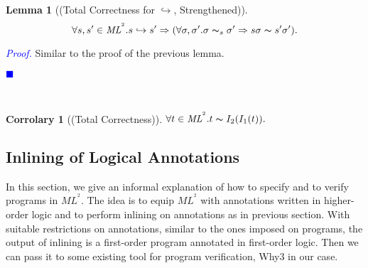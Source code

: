 \documentclass[a4paper,11pt,oneside]{article}
\theoremstyle{plain}
\newtheorem{lemma}[definition]{Lemma}
\newtheorem{corr}[definition]{Corrolary}
\renewenvironment{proof}{\noindent \begin{adjustwidth}{1.5em}{} \textcolor{blue}{\textit{Proof.}}}
{{\begin{tiny}\textcolor{blue}{$\blacksquare$}\end{tiny}}
\end{adjustwidth}~\\\noindent}
\newcommand{\inlsrc}{\textit{ML}^{^2}}
\newcommand{\icarr}{\hookrightarrow}
\newcommand{\ic}[2]{#1 \icarr #2}
\begin{document}
	\begin{lemma}[(Total Correctness for $\icarr$, Strengthened)]
     $$ \forall s,s' \in \inlsrc. \ic{s}{s'} \Rightarrow (\forall \sigma, \sigma'. \sigma \thicksim_s \sigma' \Rightarrow s\sigma \thicksim s'\sigma').$$
  \end{lemma}
	\begin{proof}
	 Similar to the proof of the previous lemma.
	\end{proof}	  
	
  \begin{corr}[(Total Correctness)]
   $ \forall t \in \inlsrc. t \thicksim I_2(I_1(t)).$
  \end{corr}	

	

\subsection{Inlining of Logical Annotations}

In this section, we give an informal explanation of how to specify and
to verify programs in $\inlsrc$. The idea is to equip $\inlsrc$ with
annotations written in higher-order logic and to perform inlining on
annotations as in previous section.
With suitable restrictions on annotations, similar to the ones imposed
on programs, the output of inlining is a first-order program annotated
in first-order logic. Then we can pass it to some existing tool for
program verification, Why3 in our case.

%
%
%
%
%
%
%
%
\end{document}
